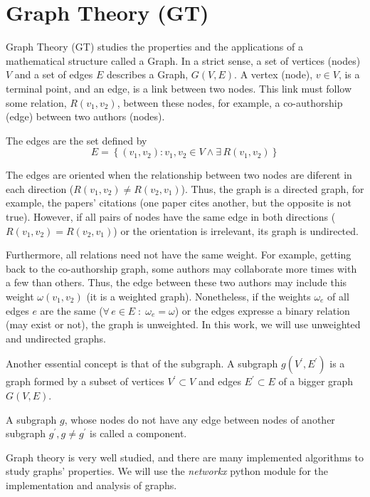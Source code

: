 \documentclass[a4paper,12pt]{report}
\begin{document}
\section{Graph Theory (GT)}

Graph Theory (GT) studies the properties and the applications of a mathematical structure called a Graph.
In a strict sense, a set of vertices (nodes) $V$ and a set of edges $E$ describes a Graph, $G(V, E)$.
A vertex (node), $v\in V$, is a terminal point, and an edge, is a link between two nodes.
This link must follow some relation, $R(v_1, v_2)$, between these nodes, for example, a co-authorship (edge) between two authors (nodes).

The edges are the set defined by
\begin{equation}
    E = \left\{(v_1, v_2) : v_1, v_2 \in V \wedge \exists\, R(v_1, v_2)\right\}
\end{equation}

The edges are oriented when the relationship between two nodes are diferent in each direction ($R(v_1, v_2) \neq R(v_2, v_1)$).
Thus, the graph is a directed graph, for example, the papers' citations (one paper cites another, but the opposite is not true).
However, if all pairs of nodes have the same edge in both directions ($ R(v_1, v_2) = R(v_2, v_1)$) or the orientation is irrelevant, its graph is undirected.

Furthermore, all relations need not have the same weight. For example, getting back to the co-authorship graph, some authors may collaborate more times with a few than others.
Thus, the edge between these two authors may include this weight $\omega(v_1, v_2)$ (it is a weighted graph).
Nonetheless, if the weights $\omega_e$ of all edges $e$ are the same ($\forall\, e\in E\; : \;\omega_e = \omega$) or the edges expresse a binary relation (may exist or not), the graph is unweighted.
In this work, we will use unweighted and undirected graphs.

Another essential concept is that of the subgraph.
A subgraph $g(V^\prime, E^\prime)$ is a graph formed by a subset of vertices $V^\prime \subset V$ and edges $E^\prime \subset E$ of a bigger graph $G(V, E)$.

A subgraph $g$, whose nodes do not have any edge between nodes of another subgraph $g^\prime, g \neq g^\prime$ is called a component.

Graph theory is very well studied, and there are many implemented algorithms to study graphs' properties.
We will use the \textit{networkx} python module for the implementation and analysis of graphs.
\end{document}
